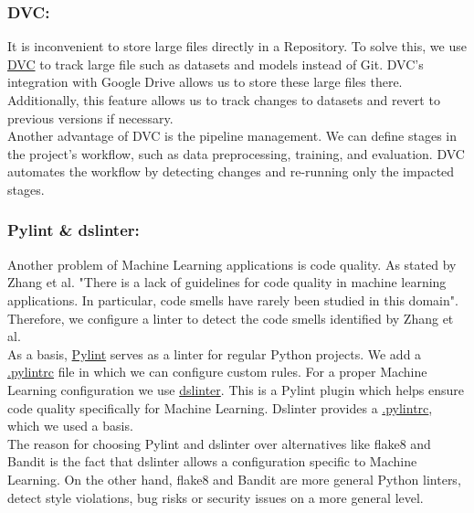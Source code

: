 \subsubsection{DVC:} \label{sec:ml-pipeline:dvc}
It is inconvenient to store large files directly in a Repository. To solve this, we use {\color{blue} \href{https://dvc.org/}{DVC}} to track large file such as datasets and models instead of Git. DVC's integration with Google Drive allows us to store these large files there. Additionally, this feature allows us to track changes to datasets and revert to previous versions if necessary. \\
Another advantage of DVC is the pipeline management. We can define stages in the project's workflow, such as data preprocessing, training, and evaluation. DVC automates the workflow by detecting changes and re-running only the impacted stages.

\subsubsection{Pylint \& dslinter:} \label{sec:ml-pipeline:lint}
Another problem of Machine Learning applications is code quality. As stated by Zhang et al. \cite{zhang2022code} "There is a lack of guidelines for code quality in machine learning applications. In particular, code smells have rarely been studied in this domain".
Therefore, we configure a linter to detect the code smells identified by Zhang et al. \\
As a basis, {\color{blue} \href{https://pylint.pycqa.org/en/latest/index.html}{Pylint}} serves as a linter for regular Python projects. We add a {\color{blue} \href{https://github.com/remla24-team12/model-training/blob/main/.pylintrc}{.pylintrc}} file in which we can configure custom rules. For a proper Machine Learning configuration we use {\color{blue} \href{https://github.com/SERG-Delft/dslinter}{dslinter}}. This is a Pylint plugin which helps ensure code quality specifically for Machine Learning. Dslinter provides a {\color{blue} \href{https://github.com/SERG-Delft/dslinter/blob/main/docs/pylint-configuration-examples/pylintrc-for-ml-projects/.pylintrc}{.pylintrc}}, which we used a basis. \\
The reason for choosing Pylint and dslinter over alternatives like flake8 and Bandit is the fact that dslinter allows a configuration specific to Machine Learning. On the other hand, flake8 and Bandit are more general Python linters, detect style violations, bug risks or security issues on a more general level.


